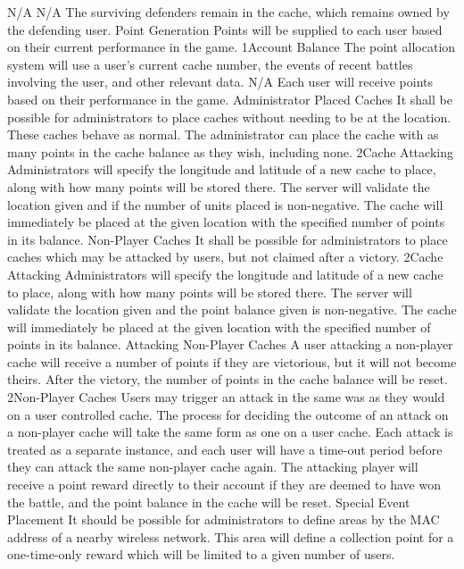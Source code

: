 			{N/A}
			{N/A}
			{The surviving defenders remain in the cache, which remains owned by the defending user.}
		\funcreq
			{Point Generation}
			{Points will be supplied to each user based on their current performance in the game.}
			{1}{Account Balance}
			{The point allocation system will use a user's current cache number, the events of recent battles involving the user, and other relevant data.}
			{N/A}
			{Each user will receive points based on their performance in the game.}
		\funcreq
			{Administrator Placed Caches}
			{It shall be possible for administrators to place caches without needing to be at the location. These caches behave as normal. The administrator can place the cache with as many points in the cache balance as they wish, including none.}
			{2}{Cache Attacking}
			{Administrators will specify the longitude and latitude of a new cache to place, along with how many points will be stored there.}
			{The server will validate the location given and if the number of units placed is non-negative.}
			{The cache will immediately be placed at the given location with the specified number of points in its balance.}
		\funcreq
			{Non-Player Caches}
			{It shall be possible for administrators to place caches which may be attacked by users, but not claimed after a victory.}
			{2}{Cache Attacking}
			{Administrators will specify the longitude and latitude of a new cache to place, along with how many points will be stored there.}
			{The server will validate the location given and the point balance given is non-negative.}
			{The cache will immediately be placed at the given location with the specified number of points in its balance.}
		\funcreq
			{Attacking Non-Player Caches}
			{A user attacking a non-player cache will receive a number of points if they are victorious, but it will not become theirs. After the victory, the number of points in the cache balance will be reset.}
			{2}{Non-Player Caches}
			{Users may trigger an attack in the same was as they would on a user controlled cache.}
			{The process for deciding the outcome of an attack on a non-player cache will take the same form as one on a user cache. Each attack is treated as a separate instance, and each user will have a time-out period before they can attack the same non-player cache again.}
			{The attacking player will receive a point reward directly to their account if they are deemed to have won the battle, and the point balance in the cache will be reset.}
		\funcreq
			{Special Event Placement}
			{It should be possible for administrators to define areas by the MAC address of a nearby wireless network. This area will define a collection point for a one-time-only reward which will be limited to a given number of users.}
